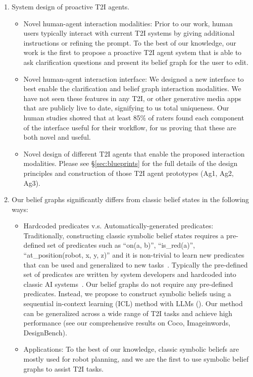 \begin{enumerate}
    \item System design of proactive T2I agents.
    \begin{itemize}
        \item Novel human-agent interaction modalities: Prior to our work, human users typically interact with current T2I systems by giving additional instructions or refining the prompt. To the best of our knowledge, our work is the first to propose a proactive T2I agent system that is able to ask clarification questions and present its belief graph for the user to edit.
\item Novel human-agent interaction interface:  We designed a new interface to best enable the clarification and belief graph interaction modalities. We have not seen these features in any T2I, or other generative media apps that are publicly live to date, signifying to us total uniqueness. Our human studies showed that at least 85\% of raters found each component of the interface useful for their workflow, for us proving that these are both novel and useful.
\item Novel design of different T2I agents that enable the proposed interaction modalities. Please see \S\ref{sec:blueprints} for the full details of the design principles and construction of those T2I agent prototypes (Ag1, Ag2, Ag3).
    \end{itemize}
    \item Our belief graphs significantly differs from classic belief states in the following ways:
    \begin{itemize}
        \item Hardcoded predicates v.s. Automatically-generated predicates: Traditionally, constructing classic symbolic belief states requires a pre-defined set of predicates such as “on(a, b)”, “is\_red(a)”, “at\_position(robot, x, y, z)” and it is non-trivial to learn new predicates that can be used and generalized to new tasks~\citep{pasula2007learning, xia2019}. Typically the pre-defined set of predicates are written by system developers and hardcoded into classic AI systems~\citep{fikes1971strips}. 
Our belief graphs do not require any pre-defined predicates. Instead, we propose to construct symbolic beliefs using a sequential in-context learning (ICL) method with LLMs (). 
Our method can be generalized across a wide range of T2I tasks and achieve high performance (see our comprehensive results on Coco, Imageinwords, DesignBench). 
\item Applications: To the best of our knowledge, classic symbolic beliefs are mostly used for robot planning, and we are the first to use symbolic belief graphs to assist T2I tasks.


\end{itemize}
\end{enumerate}
